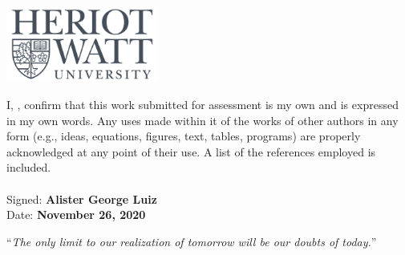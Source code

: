 \documentclass[
11pt, %
oneside,
english,
doublespacing, 
nolistspacing,
liststotoc, %
toctotoc, %
parskip, %
headsepline, %
consistentlayout, %
]{COVID-19 Detection - agl2} %
\begin{document}
\begin{titlepage}
\begin{center}
\includegraphics[width=50mm,scale=0.5]{images/logo.png} %
 
\end{center}
\end{titlepage}


\begin{declaration}
\addchaptertocentry{\authorshipname} %

\noindent I, \textbf{\authorname}, confirm that this work submitted for assessment is my own and is expressed in
my own words. Any uses made within it of the works of other authors in any form (e.g., ideas,
equations, figures, text, tables, programs) are properly acknowledged at any point of their
use. A list of the references employed is included.
\noindent \\\\Signed: \textbf{Alister George Luiz}\\
\noindent Date: \textbf{November 26, 2020}
\end{declaration}

\cleardoublepage


\vspace*{0.2\textheight}

\noindent\enquote{\itshape The only limit to our realization of tomorrow will be our doubts of today.}\bigbreak
\end{document}

